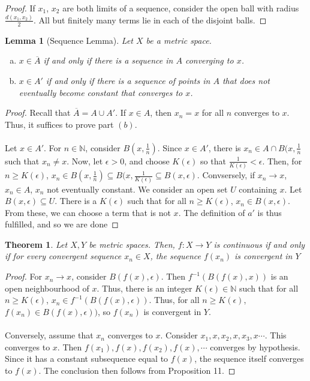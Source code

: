 \documentclass{article}
\newcommand{\N}{\mathbb{N}}
\newtheorem{theorem}{Theorem}
\newtheorem{lemma}{Lemma}
\begin{document}
 \begin{proof}
 If $x_1$, $x_2$ are both limits of a sequence, consider the open ball with radius $\frac{d(x_1,x_2)}{2}$. All but finitely many terms lie in each of the disjoint balls. 
 \end{proof}
 \begin{lemma}[Sequence Lemma]
 Let $X$ be a metric space.
 \begin{enumerate}[(a)]
     \item $x\in\overline{A}$ if and only if there is a sequence in $A$ converging to $x$.
     \item $x\in A'$ if and only if there is a sequence of points in $A$ that does not eventually become constant that converges to $x$. 
 \end{enumerate}
 \end{lemma}
 \begin{proof}
 Recall that $\overline{A}= A\cup A'$. If $x\in A$, then $x_n=x$ for all $n$ converges to $x$. Thus, it suffices to prove part $(b)$.\\
 \\
 Let $x\in A'$. For $n\in\N$, consider $B(x,\frac{1}{n})$. Since $x\in A'$, there is $x_n\in A\cap B(x,\frac{1}{n}$ such that $x_n\neq x$. Now, let $\epsilon >0$, and choose $K(\epsilon)$ so that $\frac{1}{K(\epsilon)}<\epsilon$. Then, for $n\geq K(\epsilon)$, $x_n\in B(x,\frac{1}{n})\subseteq B(x,\frac{1}{K(\epsilon)}\subseteq B(x,\epsilon)$. Convsersely, if $x_n\rightarrow x$, $x_n\in A$, $x_n$ not eventually constant. We consider an open set $U$ containing $x$. Let $B(x,\epsilon)\subseteq U$. There is a $K(\epsilon)$ such that for all $n\geq K(\epsilon)$, $x_n\in B(x,\epsilon)$. From these, we can choose a term that is not $x$. The definition of $a'$ is thus fulfilled, and so we are done
 \end{proof}
 \begin{theorem}
 Let $X,Y$ be metric spaces. Then, $f:X\rightarrow Y$ is continuous if and only if for every convergent sequence $x_n\in X$, the sequence $f(x_n)$ is convergent in $Y$ 
 \end{theorem}
 \begin{proof}
 For $x_n\rightarrow x$, consider $B(f(x),\epsilon)$. Then $f^{-1}(B(f(x),x))$ is an open neighbourhood of $x$. Thus, there is an integer $K(\epsilon)\in \N$ such that for all $n\geq K(\epsilon)$, $x_n\in f^{-1}(B(f(x),\epsilon))$. Thus, for all $n\geq K(\epsilon)$, $f(x_n)\in B(f(x),\epsilon))$, so $f(x_n)$ is convergent in $Y$.\\
 \\
 Conversely, assume that $x_n$ converges to $x$. Consider $x_1,x,x_2,x,x_3,x\cdots$. This converges to $x$. Then $f(x_1),f(x),f(x_2),f(x),\cdots$ converges by hypothesis. Since it has a constant subsequence equal to $f(x)$, the sequence itself converges to $f(x)$. The conclusion then follows from Proposition 11.
 \end{proof}
\end{document}
